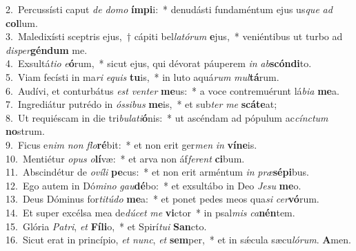 {2.~}Percussísti caput \textit{de} \textit{do}\textit{mo} \textbf{ím}\textbf{pi}i:~* denudásti fundaméntum ejus us\textit{que} \textit{ad} \textbf{col}lum.\\
{3.~}Maledixísti sceptris ejus,~† cápiti bel\textit{la}\textit{tó}\textit{rum} \textbf{e}jus,~* veniéntibus ut turbo ad \textit{di}\textit{sper}\textbf{gén}\textbf{dum} me.\\
{4.~}Exsultá\textit{ti}\textit{o} \textit{e}\textbf{ó}rum,~* sicut ejus, qui dévorat páuperem \textit{in} \textit{ab}\textbf{scón}\textbf{di}to.\\
{5.~}Viam fecísti in ma\textit{ri} \textit{e}\textit{quis} \textbf{tu}is,~* in luto aquá\textit{rum} \textit{mul}\textbf{tá}rum.\\
{6.~}Audívi, et conturbátus \textit{est} \textit{ven}\textit{ter} \textbf{me}us:~* a voce contremuérunt lá\textit{bi}\textit{a} \textbf{me}a.\\
{7.~}Ingrediátur putrédo in \textit{ós}\textit{si}\textit{bus} \textbf{me}is,~* et sub\textit{ter} \textit{me} \textbf{scá}\textbf{te}at;\\
{8.~}Ut requiéscam in die tri\textit{bu}\textit{la}\textit{ti}\textbf{ó}nis:~* ut ascéndam ad pópulum ac\textit{cín}\textit{ctum} \textbf{no}strum.\\
{9.~}Ficus e\textit{nim} \textit{non} \textit{flo}\textbf{ré}bit:~* et non erit ger\textit{men} \textit{in} \textbf{ví}\textbf{ne}is.\\
{10.~}Mentiétur \textit{o}\textit{pus} \textit{o}\textbf{lí}væ:~* et arva non áf\textit{fe}\textit{rent} \textbf{ci}bum.\\
{11.~}Abscindétur de \textit{o}\textit{ví}\textit{li} \textbf{pe}cus:~* et non erit arméntum \textit{in} \textit{præ}\textbf{sé}\textbf{pi}bus.\\
{12.~}Ego autem in Dó\textit{mi}\textit{no} \textit{gau}\textbf{dé}bo:~* et exsultábo in Deo \textit{Je}\textit{su} \textbf{me}o.\\
{13.~}Deus Dóminus for\textit{ti}\textit{tú}\textit{do} \textbf{me}a:~* et ponet pedes meos qua\textit{si} \textit{cer}\textbf{vó}rum.\\
{14.~}Et super excélsa mea de\textit{dú}\textit{cet} \textit{me} \textbf{vi}ctor~* in psal\textit{mis} \textit{ca}\textbf{nén}tem.\\
{15.~}Glória \textit{Pa}\textit{tri}, \textit{et} \textbf{Fí}\textbf{li}o,~* et Spirí\textit{tu}\textit{i} \textbf{San}cto.\\
{16.~}Sicut erat in princípio, \textit{et} \textit{nunc}, \textit{et} \textbf{sem}per,~* et in sǽcula sæcu\textit{ló}\textit{rum}. \textbf{A}men.\\
